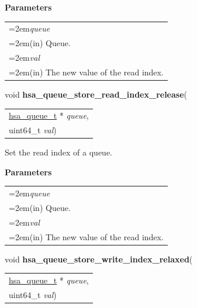 \documentclass[final]{book}
\newcommand{\hsaarg}[1]{\textit{#1}}
\begin{document}
\begin{appendices}
\noindent\textbf{Parameters}\\[-6mm]
\noindent\begin{longtable}{@{}>{\hangindent=2em}p{\textwidth}}
\hsaarg{queue}\\\hspace{2em}(in) Queue.\\[2mm]
\hsaarg{val}\\\hspace{2em}(in) The new value of the read index.
\end{longtable}
 


\noindent\begin{tcolorbox}[breakable,nobeforeafter,colframe=white,colback=lightgray,left=0mm]
void \hypertarget{group--queue-1ga412143722ee3c3ff3875b24f9899b304}{\textbf{hsa_queue_store_read_index_release}}(
\vspace{-3.5mm}\begin{longtable}{@{}p{\textwidth}}
\hspace{1.7em}\hyperlink{group--queue-1gacbb2835331f18aee30ee441f07b3fc5a}{hsa_queue_t} * \hsaarg{queue},\\
\hspace{1.7em}uint64_t \hsaarg{val})\end{longtable}

\end{tcolorbox}
Set the read index of a queue.

\noindent\textbf{Parameters}\\[-6mm]
\noindent\begin{longtable}{@{}>{\hangindent=2em}p{\textwidth}}
\hsaarg{queue}\\\hspace{2em}(in) Queue.\\[2mm]
\hsaarg{val}\\\hspace{2em}(in) The new value of the read index.
\end{longtable}
 


\noindent\begin{tcolorbox}[breakable,nobeforeafter,colframe=white,colback=lightgray,left=0mm]
void \hypertarget{group--queue-1ga46af25c91bce3a51502a228149da305e}{\textbf{hsa_queue_store_write_index_relaxed}}(
\vspace{-3.5mm}\begin{longtable}{@{}p{\textwidth}}
\hspace{1.7em}\hyperlink{group--queue-1gacbb2835331f18aee30ee441f07b3fc5a}{hsa_queue_t} * \hsaarg{queue},\\
\hspace{1.7em}uint64_t \hsaarg{val})\end{longtable}


\end{tcolorbox}
\end{appendices}
\end{document}

